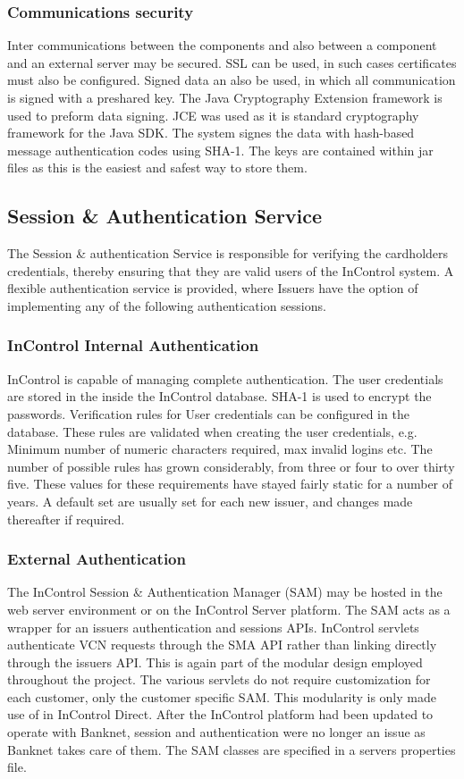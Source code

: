 \documentclass[a4paper, 11pt, titlepage]{article}
\begin{document}
\subsubsection{Communications security}
Inter communications between the components and also between a component and an external server may be secured. SSL can be used, in such cases certificates must also be configured. Signed data an also be used, in which all communication is signed with a preshared key. The Java Cryptography Extension framework is used to preform data signing. JCE was used as it is standard cryptography framework for the Java SDK. The system signes the data with hash-based message authentication codes using SHA-1. The keys are contained within jar files as this is the easiest and safest way to store them.

\subsection{Session \& Authentication Service}
The Session \& authentication Service is responsible for verifying the cardholders credentials, thereby ensuring that they are valid users of the InControl system.
A flexible authentication service is provided, where Issuers have the option of implementing any of the following authentication sessions.

\subsubsection{InControl Internal Authentication}
InControl is capable of managing complete authentication. The user credentials are stored in the inside the InControl database. SHA-1 is used to encrypt the passwords.
Verification rules for User credentials can be configured in the database. These rules are validated when creating the user credentials, e.g. Minimum number of numeric characters required, max invalid logins etc. The number of possible rules has grown considerably, from three or four to over thirty five. These values for these requirements have stayed fairly static for a number of years. A default set are usually set for each new issuer, and changes made thereafter if required. 

\subsubsection{External Authentication}
The InControl Session \& Authentication Manager (SAM) may be hosted in the web server environment or on the InControl Server platform. The SAM acts as a wrapper for an issuers authentication and sessions APIs. InControl servlets authenticate VCN requests through the SMA API rather than linking directly through the issuers API. This is again part of the modular design employed throughout the project. The various servlets do not require customization for each customer, only the customer specific SAM. This modularity is only made use of in InControl Direct. After the InControl platform had been updated to operate with Banknet, session and authentication were no longer an issue as Banknet takes care of them.
The SAM classes are specified in a servers properties file.
\end{document}
